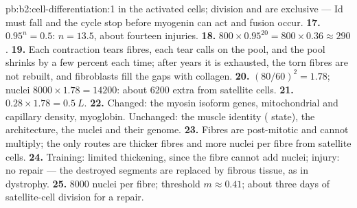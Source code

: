 \begin{solution}{pb:b2:cell-differentiation:1}
in the activated cells; division and  are exclusive
--- Id must fall and the cycle stop before myogenin can act and
fusion occur.
\textbf{17.} $0.95^{n} = 0.5$: $n = 13.5$, about fourteen injuries.
\textbf{18.} $800\times 0.95^{20} = 800\times 0.36 \approx 290$.
\textbf{19.} Each contraction tears fibres, each tear calls on the
pool, and the pool shrinks by a few percent each time; after years it
is exhausted, the torn fibres are not rebuilt, and fibroblasts fill
the gaps with collagen.
\textbf{20.} $(80/60)^{2} = 1.78$; nuclei $8000\times 1.78 = \num{14200}$:
about \num{6200} extra from satellite cells.
\textbf{21.} $0.28\times 1.78 = \qty{0.5}{L}$.
\textbf{22.} Changed: the myosin isoform genes, mitochondrial and
capillary density, myoglobin. Unchanged: the muscle identity (
state), the  architecture, the nuclei and their genome.
\textbf{23.} Fibres are post-mitotic and cannot multiply; the only
routes are thicker fibres and more nuclei per fibre from satellite
cells.
\textbf{24.} Training: limited thickening, since the fibre cannot add
nuclei; injury: no repair --- the destroyed segments are replaced by
fibrous tissue, as in dystrophy.
\textbf{25.} \num{8000} nuclei per fibre; threshold $m \approx 0.41$;
about three days of satellite-cell division for a repair.
\end{solution}
